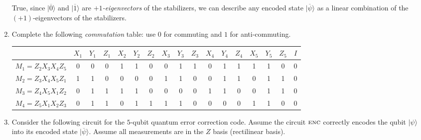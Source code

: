 \documentclass{article}
\renewcommand{\ket}[1]{| #1 \rangle}
\begin{document}
\begin{enumerate}
  True, since $\ket{\overline{0}}$ and $\ket{\overline{1}}$ are {\em $+1$-eigenvectors} of the stabilizers, we can describe any encoded state $\ket{\overline{\psi}}$ as a linear combination of the $(+1)$-eigenvectors of the stabilizers.

\item Complete the following {\em commutation} table: use $0$ for commuting and $1$ for anti-commuting.

{\footnotesize
\begin{center}
\begin{tabular}{|c||ccc|ccc|ccc|ccc|ccc|c|} \hline
                        & $X_1$ & $Y_1$ & $Z_1$ & $X_2$ & $Y_2$ & $Z_2$ & $X_3$ & $Y_3$ & $Z_3$ & $X_4$ & $Y_4$ & $Z_4$ & $X_5$ & $Y_5$ & $Z_5$ & $I$ \\ \hline
$M_1=Z_2 X_3 X_4 Z_5$   &0 &0 &0          &1 &1 &0          &0 &1 &1          &0 &1 &1          &1 &1 &0          &0     \\
$M_2=Z_3 X_4 X_5 Z_1$   &1 &1 &0          &0 &0 &0          &1 &1 &0          &0 &1 &1          &0 &1 &1          &0    \\
$M_3=Z_4 X_5 X_1 Z_2$   &0 &1 &1          &1 &1 &0          &0 &0 &0          &1 &1 &0          &0 &1 &1          &0     \\
$M_4=Z_5 X_1 X_2 Z_3$   &0 &1 &1          &0 &1 &1          &1 &1 &0          &0 &0 &0          &1 &1 &0          &0     \\ \hline
\end{tabular}
\end{center}
}

\item Consider the following circuit for the $5$-qubit quantum error correction code.
Assume the circuit $\mbox{\sc enc}$ correctly encodes the qubit $\ket{\psi}$ into its encoded state $\ket{\overline{\psi}}$.
Assume all measurements are in the $Z$ basis (rectilinear basis).


\end{enumerate}
\end{document}
